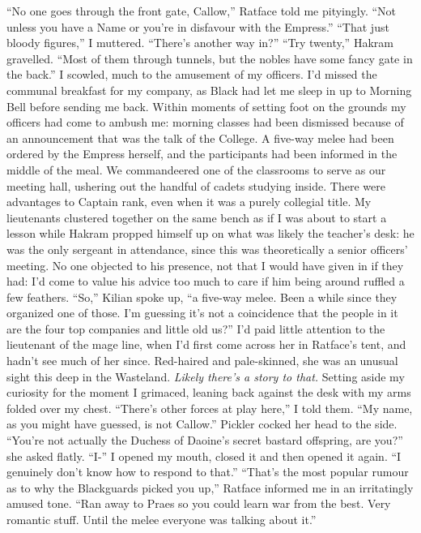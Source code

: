 \documentclass[12pt, openany]{book}
\begin{document}
“No one goes through the front gate, Callow,” Ratface told me pityingly. “Not unless you have a Name or you’re in disfavour with the Empress.”
“That just bloody figures,” I muttered. “There’s another way in?”
“Try twenty,” Hakram gravelled. “Most of them through tunnels, but the nobles have some fancy gate in the back.”
I scowled, much to the amusement of my officers. I’d missed the communal breakfast for my company, as Black had let me sleep in up to Morning Bell before sending me back. Within moments of setting foot on the grounds my officers had come to ambush me: morning classes had been dismissed because of an announcement that was the talk of the College. A five-way melee had been ordered by the Empress herself, and the participants had been informed in the middle of the meal. We commandeered one of the classrooms to serve as our meeting hall, ushering out the handful of cadets studying inside. There were advantages to Captain rank, even when it was a purely collegial title. My lieutenants clustered together on the same bench as if I was about to start a lesson while Hakram propped himself up on what was likely the teacher’s desk: he was the only sergeant in attendance, since this was theoretically a senior officers’ meeting. No one objected to his presence, not that I would have given in if they had: I’d come to value his advice too much to care if him being around ruffled a few feathers.
“So,” Kilian spoke up, “a five-way melee. Been a while since they organized one of those. I’m guessing it’s not a coincidence that the people in it are the four top companies and little old us?”
I’d paid little attention to the lieutenant of the mage line, when I’d first come across her in Ratface’s tent, and hadn’t see much of her since. Red-haired and pale-skinned, she was an unusual sight this deep in the Wasteland. \textit{Likely there’s a story to that. }Setting aside my curiosity for the moment I grimaced, leaning back against the desk with my arms folded over my chest.
“There’s other forces at play here,” I told them. “My name, as you might have guessed, is not Callow.”
Pickler cocked her head to the side.
“You’re not actually the Duchess of Daoine’s secret bastard offspring, are you?” she asked flatly.
“I-” I opened my mouth, closed it and then opened it again. “I genuinely don’t know how to respond to that.”
“That’s the most popular rumour as to why the Blackguards picked you up,” Ratface informed me in an irritatingly amused tone. “Ran away to Praes so you could learn war from the best. Very romantic stuff. Until the melee everyone was talking about it.”
\end{document}
